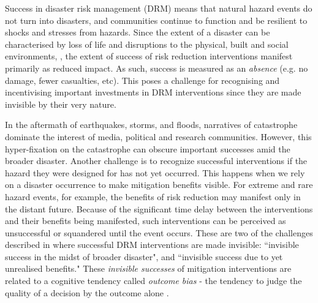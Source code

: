 \documentclass[utf8]{frontiersSCNS} %
\begin{document}
Success in disaster risk management (DRM) means that natural hazard events do not turn into disasters, and communities continue to function and be resilient to shocks and stresses from hazards. Since the extent of a disaster can be characterised by loss of life and disruptions to the physical, built and social environments, \citep{mileti1999disasters, smith2005through, moore1958tornadoes}, the extent of success of risk reduction interventions manifest primarily as reduced impact. As such, success is measured as an \textit{absence} (e.g. no damage, fewer casualties, etc). This poses a challenge for recognising and incentivising important investments in DRM interventions since they are made invisible by their very nature.

In the aftermath of earthquakes, storms, and floods, narratives of catastrophe dominate the interest of media, political and research communities. However, this hyper-fixation on the catastrophe can obscure important successes amid the broader disaster. Another challenge is to recognize successful interventions if the hazard they were designed for has not yet occurred. This happens when we rely on a disaster occurrence to make mitigation benefits visible. For extreme and rare hazard events, for example, the benefits of risk reduction may manifest only in the distant future. Because of the significant time delay between the interventions and their benefits being manifested, such interventions can be perceived as unsuccessful or squandered until the event occurs. These are two of the challenges described in \cite{lallemant_rabonza_gar_2022} where successful DRM interventions are made invisible: ``invisible success in the midst of broader disaster", and ``invisible success due to yet unrealised benefits." These \textit{invisible successes} of mitigation interventions are related to a cognitive tendency called \textit{outcome bias} - the tendency to judge the quality of a decision by the outcome alone \citep{robson_2019}. 
\end{document}
